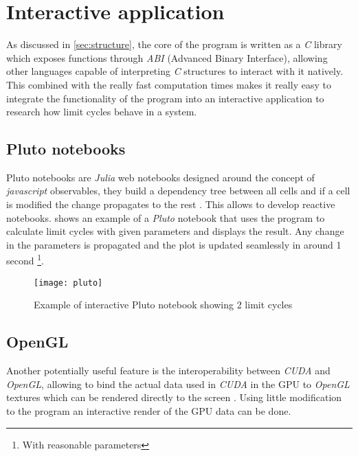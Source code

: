 
\section{Interactive application}%
\label{sec:abi}

As discussed in \cref{sec:structure}, the core of the program is written as a \emph{C} library which exposes functions through \emph{ABI} (Advanced Binary Interface), allowing other languages capable of interpreting \emph{C} structures to interact with it natively. This combined with the really fast computation times makes it really easy to integrate the functionality of the program into an interactive application to research
how limit cycles behave in a system.
%
\subsection{Pluto notebooks}

Pluto notebooks are \emph{Julia} web notebooks designed around the concept of \emph{javascript} observables, they build a dependency tree between all cells and if a cell is modified the change propagates to the rest \cite{plas_fonspplutojl_2021}. This allows to develop reactive notebooks.  shows an example of a \emph{Pluto} notebook that uses the program to calculate limit cycles with given parameters and displays the result. Any change in the parameters is propagated and the plot is updated seamlessly in around 1 second \footnote{With reasonable parameters}.

\begin{figure}[H]
    \centering
    \texttt{[image: pluto]}
    \caption{Example of interactive Pluto notebook showing 2 limit cycles}%
    \label{fig:pluto}
\end{figure}

\subsection{OpenGL}

Another potentially useful feature is the interoperability between \emph{CUDA} and \emph{OpenGL}, allowing to bind the actual data used in \emph{CUDA} in the GPU to \emph{OpenGL} textures which can be rendered directly to the screen \cite{noauthor_opengl_nodate}. Using little modification to the program an interactive render of the GPU data can be done.


